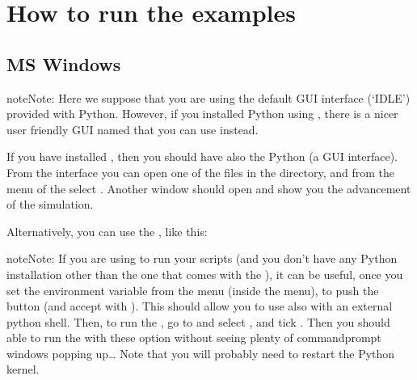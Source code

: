 \documentclass[letterpaper,10pt,english]{sphinxmanual}
\begin{document}
\section{How to run the examples}
\label{\detokenize{examples:how-to-run-the-examples}}

\subsection{MS Windows}
\label{\detokenize{examples:ms-windows}}
\begin{sphinxadmonition}{note}{Note:}
Here we suppose that you are using the default GUI interface
(‘IDLE’) provided with Python. However, if you installed
Python using , there is a nicer user friendly GUI
named  that you can use instead.
\end{sphinxadmonition}

If you have installed , then you should have also the Python
 (a GUI interface). From the interface you can open one of the
files in the  directory, and from the menu of the 
select . Another window should open and show you the advancement
of the simulation.

Alternatively, you can use the , like this:

\begin{sphinxVerbatim}[commandchars=\\\{\}]
\PYGZbs{}\PYGZbs{}\PYGZbs{}\PYGZbs{}   
\end{sphinxVerbatim}

\begin{sphinxadmonition}{note}{Note:}
If you are using  to run
your scripts (and you don’t have any Python installation
other than the one that comes with the ), it
can be useful, once you set the  environment
variable from the  menu (inside the  menu), to push the button  (and
accept with ). This should allow you to use  also
with an external python shell. Then, to run the , go
to  and select , and tick . Then you should able to run the
 with these option without seeing plenty of
command\sphinxhyphen{}prompt windows popping up…
Note that you will probably need to restart the Python kernel.
\end{sphinxadmonition}
\end{document}
